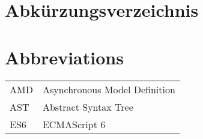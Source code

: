\ifmmtlanguagegerman
\section*{Abkürzungsverzeichnis}
\else
\section*{Abbreviations}
\fi

\begin{table}[h]		
	\begin{tabular}{ll}		
		AMD & Asynchronous Model Definition \\
		AST & Abstract Syntax Tree \\
		ES6 & ECMAScript 6 \\	
	\end{tabular}
\end{table}
